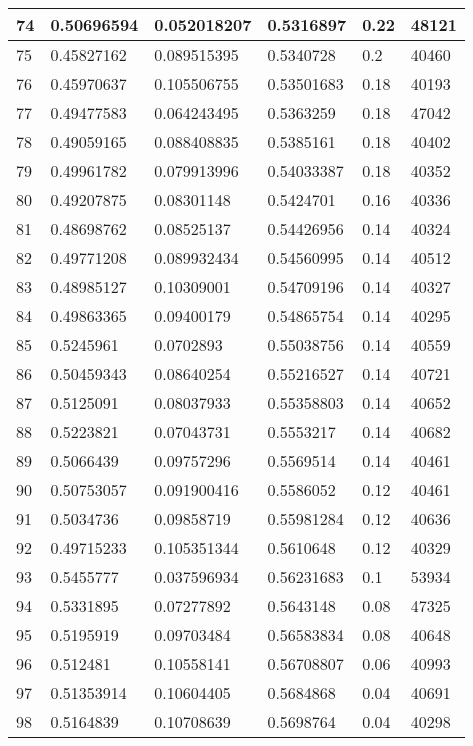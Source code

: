 \begin{longtable}{|l|l|l|l|l|l|}
74 & 0.50696594 & 0.052018207 & 0.5316897 & 0.22 & 48121 \\ \hline 
75 & 0.45827162 & 0.089515395 & 0.5340728 & 0.2 & 40460 \\ \hline 
76 & 0.45970637 & 0.105506755 & 0.53501683 & 0.18 & 40193 \\ \hline 
77 & 0.49477583 & 0.064243495 & 0.5363259 & 0.18 & 47042 \\ \hline 
78 & 0.49059165 & 0.088408835 & 0.5385161 & 0.18 & 40402 \\ \hline 
79 & 0.49961782 & 0.079913996 & 0.54033387 & 0.18 & 40352 \\ \hline 
80 & 0.49207875 & 0.08301148 & 0.5424701 & 0.16 & 40336 \\ \hline 
81 & 0.48698762 & 0.08525137 & 0.54426956 & 0.14 & 40324 \\ \hline 
82 & 0.49771208 & 0.089932434 & 0.54560995 & 0.14 & 40512 \\ \hline 
83 & 0.48985127 & 0.10309001 & 0.54709196 & 0.14 & 40327 \\ \hline 
84 & 0.49863365 & 0.09400179 & 0.54865754 & 0.14 & 40295 \\ \hline 
85 & 0.5245961 & 0.0702893 & 0.55038756 & 0.14 & 40559 \\ \hline 
86 & 0.50459343 & 0.08640254 & 0.55216527 & 0.14 & 40721 \\ \hline 
87 & 0.5125091 & 0.08037933 & 0.55358803 & 0.14 & 40652 \\ \hline 
88 & 0.5223821 & 0.07043731 & 0.5553217 & 0.14 & 40682 \\ \hline 
89 & 0.5066439 & 0.09757296 & 0.5569514 & 0.14 & 40461 \\ \hline 
90 & 0.50753057 & 0.091900416 & 0.5586052 & 0.12 & 40461 \\ \hline 
91 & 0.5034736 & 0.09858719 & 0.55981284 & 0.12 & 40636 \\ \hline 
92 & 0.49715233 & 0.105351344 & 0.5610648 & 0.12 & 40329 \\ \hline 
93 & 0.5455777 & 0.037596934 & 0.56231683 & 0.1 & 53934 \\ \hline 
94 & 0.5331895 & 0.07277892 & 0.5643148 & 0.08 & 47325 \\ \hline 
95 & 0.5195919 & 0.09703484 & 0.56583834 & 0.08 & 40648 \\ \hline 
96 & 0.512481 & 0.10558141 & 0.56708807 & 0.06 & 40993 \\ \hline 
97 & 0.51353914 & 0.10604405 & 0.5684868 & 0.04 & 40691 \\ \hline 
98 & 0.5164839 & 0.10708639 & 0.5698764 & 0.04 & 40298 \\ \hline 

\end{longtable}
